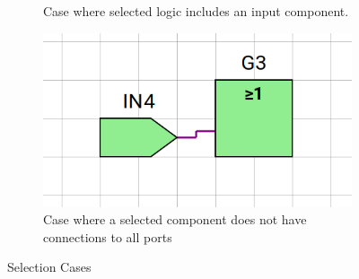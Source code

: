 \begin{figure} [h]
\begin{subfigure}{0.48\textwidth}
        \caption{Case where selected logic includes an input component.}
        \label{subfig:SelCase3}
    \end{subfigure}
    \begin{subfigure}{0.48\textwidth}
        \centering
        \includegraphics[width=0.8\linewidth]{05.ImpPlan/SelCase4.png}
        \caption{Case where a selected component does not have connections to all ports}
        \label{subfig:SelCase4}
    \end{subfigure}
    \caption{Selection Cases}
    \label{fig:SelCases}
\end{figure}

